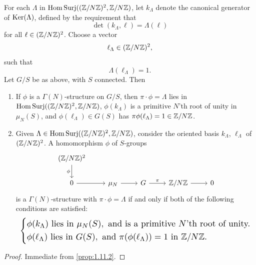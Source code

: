 \begin{kprop}\label{prop:10.2.4}
For each $\Lambda$ in $\mathrm{Hom\,Surj}((\mathbb{Z}/N\mathbb{Z})^2, \mathbb{Z}/N\mathbb{Z})$, let $k_\Lambda$ denote the canonical generator of $\operatorname{Ker}(\Lambda)$, defined by the requirement that
\[
\det(k_\Lambda, \ell) = \Lambda(\ell)
\]
for all $\ell \in (\mathbb{Z}/N\mathbb{Z})^2$. Choose a vector
\[
\ell_\Lambda \in (\mathbb{Z}/N\mathbb{Z})^2 ,
\]
such that
\[
\Lambda(\ell_\Lambda) = 1 .
\]
Let $G/S$ be as above, with $S$ connected. Then
\begin{enumerate}[label=(\arabic*)]
\item If $\phi$ is a $\Gamma(N)$-structure on $G/S$, then $\pi \cdot \phi = \Lambda$ lies in $\mathrm{Hom\,Surj}((\mathbb{Z}/N\mathbb{Z})^2, \mathbb{Z}/N\mathbb{Z})$, $\phi(k_\Lambda)$ is a primitive $N$'th root of unity in $\mu_N(S)$, and $\phi(\ell_\Lambda) \in G(S)$ has $\pi\phi(\ell_\Lambda) = 1 \in \mathbb{Z}/N\mathbb{Z}$.
\item Given $\Lambda \in \mathrm{Hom\,Surj}((\mathbb{Z}/N\mathbb{Z})^2, \mathbb{Z}/N\mathbb{Z})$, consider the oriented basis $k_\Lambda$, $\ell_\Lambda$ of $(\mathbb{Z}/N\mathbb{Z})^2$. A homomorphism $\phi$ of $S$-groups
\begin{equation*}
\begin{tikzcd}[row sep=1.8em]
(\Z/N\Z)^2 \arrow[d, "\phi"'] \\
0 \arrow[r] & \mu_N \arrow[r] & G \arrow[r, "\pi"] & \Z/N\Z \arrow[r] & 0
\end{tikzcd}
\end{equation*}
is a $\Gamma(N)$-structure with $\pi \cdot \phi = \Lambda$ if and only if both of the following conditions are satisfied:
\[
\resizebox{0.96\linewidth}{!}{$\displaystyle
\left\{\begin{aligned}
& \phi(k_\Lambda) \text{ lies in } \mu_N(S), \text{ and is a primitive } N\text{'th root of unity.} \\
& \phi(\ell_\Lambda) \text{ lies in } G(S), \text{ and } \pi(\phi(\ell_\Lambda)) = 1 \text{ in } \Z/N\Z.
\end{aligned}\right.
$}
\]
\end{enumerate}
\end{kprop}

\begin{proof}
Immediate from \eqref{prop:1.11.2}.
\end{proof}

